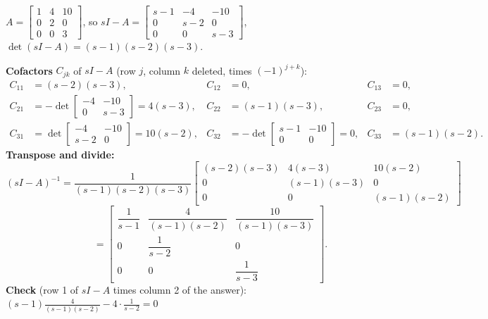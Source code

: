 \begin{workbox}[title={Worked example (AE1, A1.4)}]
$A=\begin{bmatrix}1&4&10\\0&2&0\\0&0&3\end{bmatrix}$, so $sI-A=\begin{bmatrix}s-1&-4&-10\\0&s-2&0\\0&0&s-3\end{bmatrix}$, \ $\det(sI-A)=(s-1)(s-2)(s-3)$.

\textbf{Cofactors} $C_{jk}$ of $sI-A$ (row $j$, column $k$ deleted, times $(-1)^{j+k}$):
\begin{align*}
C_{11}&=(s-2)(s-3), & C_{12}&=0, & C_{13}&=0,\\
C_{21}&=-\det\begin{bmatrix}-4&-10\\0&s-3\end{bmatrix}=4(s-3), & C_{22}&=(s-1)(s-3), & C_{23}&=0,\\
C_{31}&=\det\begin{bmatrix}-4&-10\\s-2&0\end{bmatrix}=10(s-2), & C_{32}&=-\det\begin{bmatrix}s-1&-10\\0&0\end{bmatrix}=0, & C_{33}&=(s-1)(s-2).
\end{align*}
\textbf{Transpose and divide:}
\[
(sI-A)^{-1}=\frac{1}{(s-1)(s-2)(s-3)}\begin{bmatrix}(s-2)(s-3)&4(s-3)&10(s-2)\\0&(s-1)(s-3)&0\\0&0&(s-1)(s-2)\end{bmatrix}
\]
\[
\phantom{(sI-A)^{-1}}=\begin{bmatrix}\dfrac{1}{s-1}&\dfrac{4}{(s-1)(s-2)}&\dfrac{10}{(s-1)(s-3)}\\[2mm]0&\dfrac1{s-2}&0\\[1mm]0&0&\dfrac1{s-3}\end{bmatrix}.
\]
\textbf{Check} (row 1 of $sI-A$ times column 2 of the answer): $(s-1)\frac{4}{(s-1)(s-2)}-4\cdot\frac1{s-2}=0$ \checkmark
\end{workbox}

